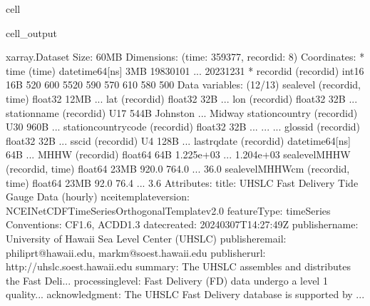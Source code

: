 \documentclass[letterpaper,10pt,english]{jupyterBook}
\begin{document}
\begin{sphinxuseclass}{cell}
\begin{sphinxVerbatimOutput}
\begin{sphinxuseclass}{cell_output}
\begin{sphinxVerbatim}[commandchars=\\\{\}]
\PYGZlt{}xarray.Dataset\PYGZgt{} Size: 60MB
Dimensions:               (time: 359377, record\PYGZus{}id: 8)
Coordinates:
  * time                  (time) datetime64[ns] 3MB 1983\PYGZhy{}01\PYGZhy{}01 ... 2023\PYGZhy{}12\PYGZhy{}31
  * record\PYGZus{}id             (record\PYGZus{}id) int16 16B 520 600 5520 590 570 610 580 500
Data variables: (12/13)
    sea\PYGZus{}level             (record\PYGZus{}id, time) float32 12MB ...
    lat                   (record\PYGZus{}id) float32 32B ...
    lon                   (record\PYGZus{}id) float32 32B ...
    station\PYGZus{}name          (record\PYGZus{}id) \PYGZlt{}U17 544B \PYGZsq{}Johnston\PYGZsq{} ... \PYGZsq{}Midway\PYGZsq{}
    station\PYGZus{}country       (record\PYGZus{}id) \PYGZlt{}U30 960B ...
    station\PYGZus{}country\PYGZus{}code  (record\PYGZus{}id) float32 32B ...
    ...                    ...
    gloss\PYGZus{}id              (record\PYGZus{}id) float32 32B ...
    ssc\PYGZus{}id                (record\PYGZus{}id) \PYGZlt{}U4 128B ...
    last\PYGZus{}rq\PYGZus{}date          (record\PYGZus{}id) datetime64[ns] 64B ...
    MHHW                  (record\PYGZus{}id) float64 64B 1.225e+03 ... 1.204e+03
    sea\PYGZus{}level\PYGZus{}MHHW        (record\PYGZus{}id, time) float64 23MB \PYGZhy{}920.0 \PYGZhy{}764.0 ... \PYGZhy{}36.0
    sea\PYGZus{}level\PYGZus{}MHHW\PYGZus{}cm     (record\PYGZus{}id, time) float64 23MB \PYGZhy{}92.0 \PYGZhy{}76.4 ... \PYGZhy{}3.6
Attributes:
    title:                  UHSLC Fast Delivery Tide Gauge Data (hourly)
    ncei\PYGZus{}template\PYGZus{}version:  NCEI\PYGZus{}NetCDF\PYGZus{}TimeSeries\PYGZus{}Orthogonal\PYGZus{}Template\PYGZus{}v2.0
    featureType:            timeSeries
    Conventions:            CF\PYGZhy{}1.6, ACDD\PYGZhy{}1.3
    date\PYGZus{}created:           2024\PYGZhy{}03\PYGZhy{}07T14:27:49Z
    publisher\PYGZus{}name:         University of Hawaii Sea Level Center (UHSLC)
    publisher\PYGZus{}email:        philiprt@hawaii.edu, markm@soest.hawaii.edu
    publisher\PYGZus{}url:          http://uhslc.soest.hawaii.edu
    summary:                The UHSLC assembles and distributes the Fast Deli...
    processing\PYGZus{}level:       Fast Delivery (FD) data undergo a level 1 quality...
    acknowledgment:         The UHSLC Fast Delivery database is supported by ...
\end{sphinxVerbatim}

\end{sphinxuseclass}\end{sphinxVerbatimOutput}

\end{sphinxuseclass}
\end{document}
